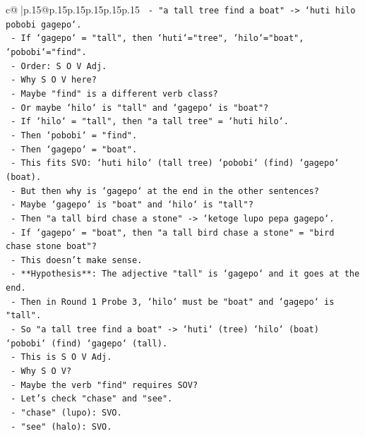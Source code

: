 \documentclass{article}
\begin{document}
{\begin{supertabular}{c@{$\;$}|p{.15\linewidth}@{}p{.15\linewidth}p{.15\linewidth}p{.15\linewidth}p{.15\linewidth}p{.15\linewidth}}
{{{\texttt{        {-} "a tall tree find a boat" {-}> `huti hilo pobobi gagepo`.} \\
\texttt{          {-} If `gagepo` = "tall", then `huti`="tree", `hilo`="boat", `pobobi`="find".} \\
\texttt{          {-} Order: S O V Adj.} \\
\texttt{          {-} Why S O V here?} \\
\texttt{          {-} Maybe "find" is a different verb class?} \\
\texttt{          {-} Or maybe `hilo` is "tall" and `gagepo` is "boat"?} \\
\texttt{          {-} If `hilo` = "tall", then "a tall tree" = `huti hilo`.} \\
\texttt{          {-} Then `pobobi` = "find".} \\
\texttt{          {-} Then `gagepo` = "boat".} \\
\texttt{          {-} This fits SVO: `huti hilo` (tall tree) `pobobi` (find) `gagepo` (boat).} \\
\texttt{          {-} But then why is `gagepo` at the end in the other sentences?} \\
\texttt{          {-} Maybe `gagepo` is "boat" and `hilo` is "tall"?} \\
\texttt{          {-} Then "a tall bird chase a stone" {-}> `ketoge lupo pepa gagepo`.} \\
\texttt{          {-} If `gagepo` = "boat", then "a tall bird chase a stone" = "bird chase stone boat"?} \\
\texttt{          {-} This doesn't make sense.} \\
\texttt{          {-} **Hypothesis**: The adjective "tall" is `gagepo` and it goes at the end.} \\
\texttt{          {-} Then in Round 1 Probe 3, `hilo` must be "boat" and `gagepo` is "tall".} \\
\texttt{          {-} So "a tall tree find a boat" {-}> `huti` (tree) `hilo` (boat) `pobobi` (find) `gagepo` (tall).} \\
\texttt{          {-} This is S O V Adj.} \\
\texttt{          {-} Why S O V?} \\
\texttt{          {-} Maybe the verb "find" requires SOV?} \\
\texttt{          {-} Let's check "chase" and "see".} \\
\texttt{          {-} "chase" (lupo): SVO.} \\
\texttt{          {-} "see" (halo): SVO.} \\
}}}
\end{supertabular}}
\end{document}
